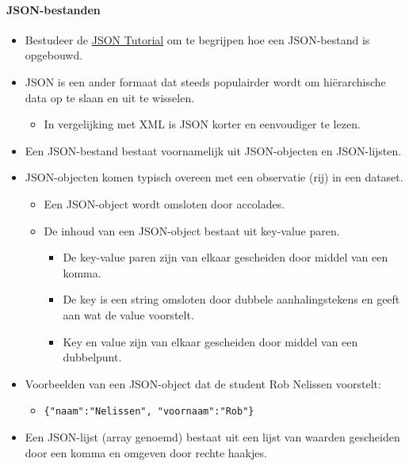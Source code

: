 \documentclass[]{memoir}
\providecommand{\tightlist}{%
  \setlength{\itemsep}{0pt}\setlength{\parskip}{0pt}}
\let\oldparagraph\paragraph
\renewcommand{\paragraph}[1]{\oldparagraph{#1}\mbox{}}
\begin{document}
\hypertarget{json-bestanden}{%
\paragraph{JSON-bestanden}\label{json-bestanden}}

\begin{itemize}
\tightlist
\item
  Bestudeer de \href{http://beginnersbook.com/2015/04/json-tutorial/}{JSON Tutorial} om te begrijpen hoe een JSON-bestand is opgebouwd.
\item
  JSON is een ander formaat dat steeds populairder wordt om hiërarchische data op te slaan en uit te wisselen.

  \begin{itemize}
  \tightlist
  \item
    In vergelijking met XML is JSON korter en eenvoudiger te lezen.
  \end{itemize}
\item
  Een JSON-bestand bestaat voornamelijk uit JSON-objecten en JSON-lijsten.
\item
  JSON-objecten komen typisch overeen met een observatie (rij) in een dataset.

  \begin{itemize}
  \tightlist
  \item
    Een JSON-object wordt omsloten door accolades.
  \item
    De inhoud van een JSON-object bestaat uit key-value paren.

    \begin{itemize}
    \tightlist
    \item
      De key-value paren zijn van elkaar gescheiden door middel van een komma.
    \item
      De key is een string omsloten door dubbele aanhalingstekens en geeft aan wat de value voorstelt.
    \item
      Key en value zijn van elkaar gescheiden door middel van een dubbelpunt.
    \end{itemize}
  \end{itemize}
\item
  Voorbeelden van een JSON-object dat de student Rob Nelissen voorstelt:

  \begin{itemize}
  \tightlist
  \item
    \texttt{\{"naam":"Nelissen",\ "voornaam":"Rob"\}}
  \end{itemize}
\item
  Een JSON-lijst (array genoemd) bestaat uit een lijst van waarden gescheiden door een komma en omgeven door rechte haakjes.


\end{itemize}
\end{document}
